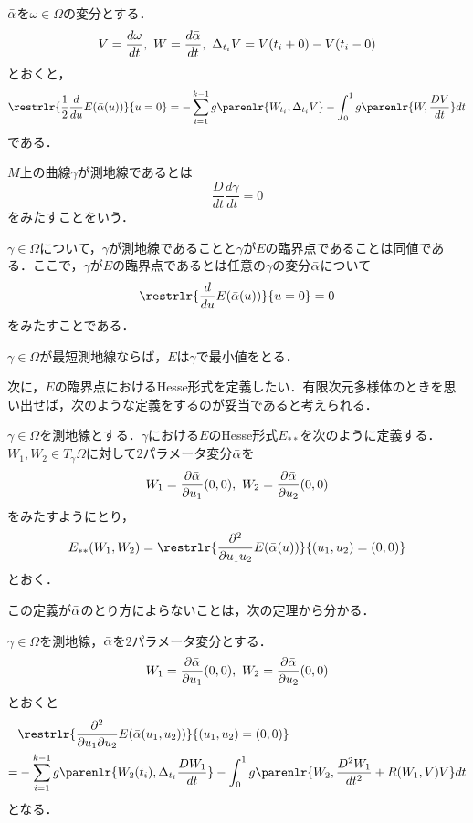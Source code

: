 \documentclass[uplatex]{jsarticle}
\begin{document}
\begin{theorem}[第一変分公式]
$\Bar{\alpha}$を$\omega \in \Omega$の変分とする．
\[ V = \frac{d\omega}{dt},\ W = \frac{d\Bar{\alpha}}{dt},\ \Delta_{t_i} V = V(t_i+0) - V(t_i-0) \]
とおくと，
\begin{align*}
    \restrlr{\frac{1}{2}\frac{d}{du}E(\Bar{\alpha}(u))}{u=0}
    = -\sum_{i=1}^{k-1} g\parenlr{W_{t_i},\Delta_{t_i} V} - \int_0^1 g\parenlr{W,\frac{DV}{dt}}dt
\end{align*}
である．
\end{theorem}

\begin{definition}
$M$上の曲線$\gamma$が測地線であるとは
\[ \frac{D}{dt}\frac{d\gamma}{dt}=0 \]
をみたすことをいう．
\end{definition}

\begin{proposition}
$\gamma　\in \Omega$について，$\gamma$が測地線であることと$\gamma$が$E$の臨界点であることは同値である．ここで，$\gamma$が$E$の臨界点であるとは任意の$\gamma$の変分$\Bar{\alpha}$について
\[ \restrlr{\frac{d}{du}E(\Bar{\alpha}(u))}{u=0} = 0 \]
をみたすことである．
\end{proposition}

\begin{proposition}
$\gamma \in \Omega$が最短測地線ならば，$E$は$\gamma$で最小値をとる．
\end{proposition}

次に，$E$の臨界点におけるHesse形式を定義したい．有限次元多様体のときを思い出せば，次のような定義をするのが妥当であると考えられる．

\begin{definition}
$\gamma \in \Omega$を測地線とする．$\gamma$における$E$のHesse形式$E_{\ast \ast}$を次のように定義する．$W_1,W_2\in T_\gamma \Omega$に対して2パラメータ変分$\Bar{\alpha}$を
\[ W_1 = \frac{\partial \Bar{\alpha}}{\partial u_1}(0,0),\ W_2 = \frac{\partial \Bar{\alpha}}{\partial u_2}(0,0) \]
をみたすようにとり，
\[ E_{\ast \ast}(W_1,W_2) = \restrlr{\frac{\partial^2}{\partial u_1 u_2}E(\Bar{\alpha}(u))}{(u_1,u_2)=(0,0)} \]
とおく．
\end{definition}

この定義が$\Bar{\alpha}$のとり方によらないことは，次の定理から分かる．

\begin{theorem}[第二変分公式]
$\gamma \in \Omega$を測地線，$\Bar{\alpha}$を2パラメータ変分とする．
\[ W_1 = \frac{\partial \Bar{\alpha}}{\partial u_1}(0,0),\ W_2 = \frac{\partial \Bar{\alpha}}{\partial u_2}(0,0) \]
とおくと
\begin{align*}
&\restrlr{\frac{\partial^2}{\partial u_1 \partial u_2}E(\Bar{\alpha}(u_1,u_2))}{(u_1,u_2)=(0,0)} \\ 
= &-\sum_{i=1}^{k-1} g\parenlr{W_2(t_i),\Delta_{t_i} \frac{DW_1}{dt}}
-\int_0^1 g\parenlr{W_2,\frac{D^2W_1}{dt^2}+R(W_1,V)V}dt
\end{align*}
となる．
\end{theorem}
\end{document}
